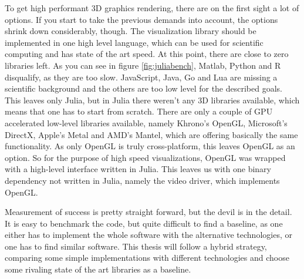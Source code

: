 To get high performant 3D graphics rendering, there are on the first sight a lot of options.
If you start to take the previous demands into account, the options shrink down considerably, though.
The visualization library should be implemented in one high level language, which can be used for scientific computing and has state of the art speed. At this point, there are close to zero libraries left. As you can see in figure \ref{fig:juliabench}, Matlab, Python and R disqualify, as they are too slow. JavaScript, Java, Go and Lua are missing a scientific background and the others are too low level for the described goals.
This leaves only Julia, but in Julia there weren't any 3D libraries available, which means that one has to start from scratch.
There are only a couple of GPU accelerated low-level libraries available, namely Khrono's \ac{OpenGL}, Microsoft's DirectX, Apple's Metal and AMD's Mantel, which are offering basically the same functionality. As only \ac{OpenGL} is truly cross-platform, this leaves \ac{OpenGL} as an option.
So for the purpose of high speed visualizations, \ac{OpenGL} was wrapped with a high-level interface written in Julia. This leaves us with one binary dependency not written in Julia, namely the video driver, which implements \ac{OpenGL}.

Measurement of success is pretty straight forward, but the devil is in the detail.
It is easy to benchmark the code, but quite difficult to find a baseline, as one either has to implement the whole software with the alternative technologies, or one has to find similar software.
This thesis will follow a hybrid strategy, comparing some simple implementations with different technologies and choose some rivaling state of the art libraries as a baseline.

